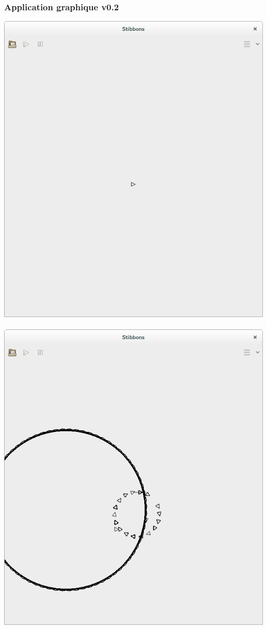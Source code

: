 \begin{frame}
\frametitle{Application graphique v0.2}
\begin{center}
\includegraphics[scale=0.16]{doc/report/screenshot/stibbons-0-2-1.png}
~~~~~~~~
\includegraphics[scale=0.16]{doc/report/screenshot/stibbons-0-2-2.png}
\end{center}


\end{frame}
